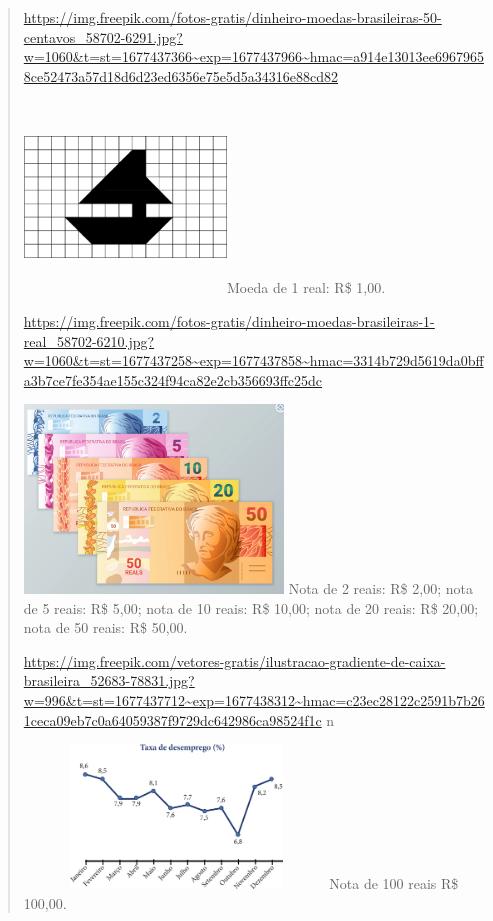 \begin{enumerate}
\begin{escolha}
\begin{enumerate}
\begin{itemize}
\begin{itemize}
\begin{escolha}
\begin{quote}
\url{https://img.freepik.com/fotos-gratis/dinheiro-moedas-brasileiras-50-centavos_58702-6291.jpg?w=1060\&t=st=1677437366~exp=1677437966~hmac=a914e13013ee69679658ce52473a57d18d6d23ed6356e75e5d5a34316e88cd82}

\includegraphics[width=2.11667in,height=2.01180in]{media/image77.png}Moeda
de 1 real: R\$ 1,00.

\url{https://img.freepik.com/fotos-gratis/dinheiro-moedas-brasileiras-1-real_58702-6210.jpg?w=1060\&t=st=1677437258~exp=1677437858~hmac=3314b729d5619da0bffa3b7ce7fe354ae155c324f94ca82e2cb356693ffc25dc}

\includegraphics[width=2.71068in,height=1.97500in]{media/image78.png}
Nota de 2 reais: R\$ 2,00; nota de 5 reais: R\$ 5,00; nota de 10 reais: R\$ 10,00; nota de 20 reais: R\$ 20,00; nota de 50 reais: R\$ 50,00.

\url{https://img.freepik.com/vetores-gratis/ilustracao-gradiente-de-caixa-brasileira_52683-78831.jpg?w=996\&t=st=1677437712~exp=1677438312~hmac=c23ec28122c2591b7b261ceca09eb7c0a64059387f9729dc642986ca98524f1c}
n

\includegraphics[width=3.18285in,height=1.50833in]{media/image79.png}Nota
de 100 reais R\$ 100,00.


\end{quote}
\end{escolha}
\end{itemize}
\end{itemize}
\end{enumerate}
\end{escolha}
\end{enumerate}
